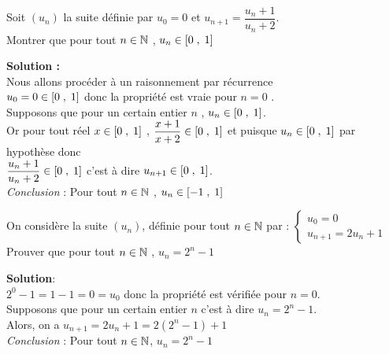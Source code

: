 \begin{exercice}
 Soit $(u_{n})$ la suite définie par $u_{0}=0$ et $ u_{n+1}= \dfrac{u_{n}+1}{u_{n}+2}$.\\
Montrer que pour tout $ n\in\mathbb{N} $ , $ u_{n}\in\left[0\;,\; 1\right] $ 
\end{exercice}
\textbf{Solution :}\\
 Nous allons procéder à un raisonnement par récurrence \\
$u_{0}=0 \in\left[0\;,\; 1\right] $ donc la propriété  est vraie pour $ n=0 $ .\\
Supposons que pour un certain  entier $ n$ , $ u_{n}\in\left[0\;,\; 1\right] $.\\
Or pour tout réel $ x\in\left[0\;,\; 1\right] $ , $\dfrac{x+1}{x+2}\in\left[0\;,\; 1\right] $ et puisque $ u_{n}\in\left[0\;,\; 1\right]$  par hypothèse donc \\
$ \dfrac{u_{n}+1}{u_{n}+2}\in\left[0\;,\; 1\right]$ c'est à dire $ u_{n+1}\in\left[0\;,\; 1\right]$. \\
\emph{Conclusion} : Pour tout $ n\in\mathbb{N} $ , $ u_{n}\in\left[-1\;,\; 1\right] $
\begin{exercice}
 On considère la suite $(u_{n})$, définie pour tout  $ n\in\mathbb{N} $ par : $ 
\left\{\begin{array}{l}
u_{0}=0 \\
u_{n+1}=2u_{n}+1
\end{array}\right.$ \\
Prouver que pour tout $ n\in\mathbb{N} $  , $ u_{n}=2^{n}-1 $
\end{exercice}
\textbf{Solution}:\\
 $2^{0}-1 = 1-1=0= u_{0}$ donc la propriété est vérifiée pour $ n=0 $.\\
Supposons que pour un certain  entier $ n$ c'est à dire $ u_{n}=2^{n}-1 $.\\
Alors, on a $ u_{n+1}=2u_{n}+1= 2(2^{n}-1)+1 $ \\

\emph{Conclusion} : Pour tout $ n\in\mathbb{N} $, $ u_{n}=2^{n}-1 $
